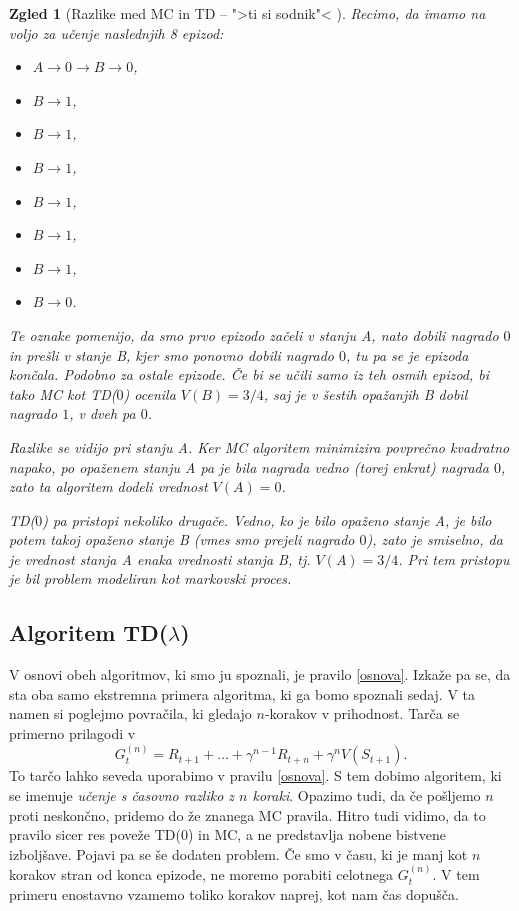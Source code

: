 \documentclass[12pt,a4paper]{amsart}
\theoremstyle{definition} %
\theoremstyle{plain} %
\newtheorem{zgled}[definicija]{Zgled}
\begin{document}
\begin{zgled}[Razlike med MC in TD -- ">ti si sodnik"< \cite{RLintro}]
    Recimo, da imamo na voljo za učenje naslednjih 8 epizod:
    \begin{multicols}{2}
    \begin{itemize}
        \item $A \rightarrow 0 \rightarrow B \rightarrow 0$,
        \item $B \rightarrow 1$,
        \item $B \rightarrow 1$,
        \item $B \rightarrow 1$,
        \item $B \rightarrow 1$,
        \item $B \rightarrow 1$,
        \item $B \rightarrow 1$,
        \item $B \rightarrow 0$.
    \end{itemize}
    \end{multicols} 
    Te oznake pomenijo, da smo prvo epizodo začeli v stanju A, nato dobili nagrado $0$ in prešli v 
    stanje B, kjer smo ponovno dobili nagrado $0$, tu pa se je epizoda končala. Podobno za ostale 
    epizode. Če bi se učili samo iz teh osmih epizod, bi tako MC kot TD($0$) ocenila $V(B) = 3/4$, 
    saj je v šestih opažanjih B dobil nagrado $1$, v dveh pa $0$.

    Razlike se vidijo pri stanju A. Ker MC algoritem minimizira povprečno kvadratno napako, po opaženem 
    stanju A pa je bila nagrada vedno (torej enkrat) nagrada $0$, zato ta algoritem dodeli vrednost 
    $V(A) = 0$.

    TD($0$) pa pristopi nekoliko drugače. Vedno, ko je bilo opaženo stanje A, je bilo potem takoj 
    opaženo stanje B (vmes smo prejeli nagrado $0$), zato je smiselno, da je vrednost stanja A 
    enaka vrednosti stanja B, tj. $V(A) = 3/4$. Pri tem pristopu je bil problem modeliran kot 
    markovski proces.
\end{zgled}

\subsection{Algoritem TD($\lambda$)}
V osnovi obeh algoritmov, ki smo ju spoznali, je pravilo \eqref{osnova}. Izkaže pa se, da sta oba 
samo ekstremna primera algoritma, ki ga bomo spoznali sedaj. V ta namen si poglejmo povračila, 
ki gledajo $n$-korakov v prihodnost. Tarča se primerno prilagodi v
$$
G_t^{(n)} = R_{t+1} + \dots + \gamma^{n-1} R_{t+n} + \gamma^n V(S_{t+1}).
$$
To tarčo lahko seveda uporabimo v pravilu \eqref{osnova}. S tem dobimo algoritem, ki se imenuje 
\textit{učenje s časovno razliko z $n$ koraki}. Opazimo tudi, da če pošljemo $n$ proti neskončno, 
pridemo do že znanega MC pravila. Hitro tudi vidimo, da to pravilo sicer res poveže TD($0$) in 
MC, a ne predstavlja nobene bistvene izboljšave. Pojavi pa se še dodaten problem. Če smo v času, ki
je manj kot $n$ korakov stran od konca epizode, ne moremo porabiti celotnega $G_t^{(n)}$. V tem 
primeru enostavno vzamemo toliko korakov naprej, kot nam čas dopušča. 
\end{document}
